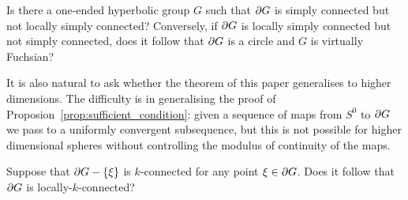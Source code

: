 \documentclass[a4paper]{article}
\begin{document}
\begin{question} Is there a one-ended hyperbolic group $G$ such that $\partial
  G$ is simply connected but not locally simply connected? Conversely, if
  $\partial G$ is locally simply connected but not simply connected, does it
  follow that $\partial G$ is a circle and $G$ is virtually Fuchsian?
\end{question}

It is also natural to ask whether the theorem of this paper generalises to
higher dimensions. The difficulty is in generalising the proof of
Proposion~\ref{prop:sufficient_condition}: given a sequence of maps from $S^0$
to $\partial G$ we pass to a uniformly convergent subsequence, but this is not
possible for higher dimensional spheres without controlling the modulus of
continuity of the maps.

\begin{question} Suppose that $\partial G - \left\{\xi\right\}$ is $k$-connected for any
  point $\xi \in \partial G$. Does it follow that $\partial G$ is
  locally-$k$-connected?
\end{question}


\end{document}
